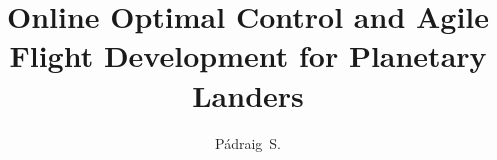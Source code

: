 \documentclass[defaultstyle,11pt]{thesis}
\title{Online Optimal Control and Agile Flight Development for Planetary Landers}
\author{Pádraig~S.}{Lysandrou}
\begin{document}




\nocite{*}		%

\appendix


\end{document}

